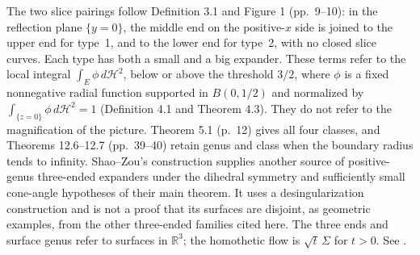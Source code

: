 \begin{example}
The two slice pairings follow Definition 3.1 and Figure 1 (pp.~9--10): in the reflection plane $\{y=0\}$, the middle end on the positive-$x$ side is joined to the upper end for type~1, and to the lower end for type~2, with no closed slice curves. Each type has both a small and a big expander. These terms refer to the local integral $\int_E\phi\,d\mathcal H^2$, below or above the threshold $3/2$, where $\phi$ is a fixed nonnegative radial function supported in $B(0,1/2)$ and normalized by $\int_{\{z=0\}}\phi\,d\mathcal H^2=1$ (Definition 4.1 and Theorem 4.3). They do not refer to the magnification of the picture. Theorem 5.1 (p.~12) gives all four classes, and Theorems 12.6--12.7 (pp.~39--40) retain genus and class when the boundary radius tends to infinity.
Shao--Zou's construction supplies another source of positive-genus three-ended expanders under the dihedral symmetry and sufficiently small cone-angle hypotheses of their main theorem. It uses a desingularization construction and is not a proof that its surfaces are disjoint, as geometric examples, from the other three-ended families cited here. The three ends and surface genus refer to surfaces in $\mathbb R^3$; the homothetic flow is $\sqrt t\,\Sigma$ for $t>0$. See \cite{CatShaoZou2025a}.
\end{example}

